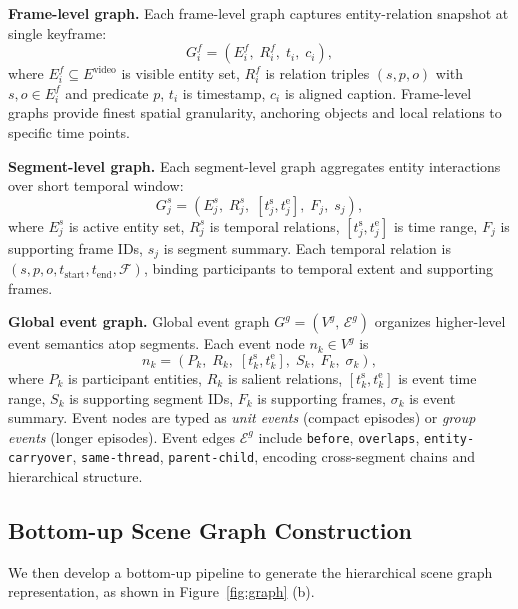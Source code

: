 \documentclass[sigconf, screen, review, anonymous]{acmart}
\begin{document}
\textbf{Frame-level graph.}
Each frame-level graph captures entity-relation snapshot at single
keyframe:
\begin{equation}
  G_i^{f} = (E_i^{f},\; R_i^{f},\; t_i,\; c_i),
\end{equation}
where $E_i^{f} \subseteq E^{\text{video}}$ is visible entity set,
$R_i^{f}$ is relation triples $(s, p, o)$ with
$s,o \in E_i^{f}$ and predicate $p$, $t_i$ is timestamp, $c_i$ is
aligned caption.  Frame-level graphs provide finest spatial
granularity, anchoring objects and local relations to
specific time points.

\textbf{Segment-level graph.}
Each segment-level graph aggregates entity interactions over short
temporal window:
\begin{equation}
  G_j^{s} = (E_j^{s},\; R_j^{s},\;
  [t_j^{\text{s}}, t_j^{\text{e}}],\; F_j,\; s_j),
\end{equation}
where $E_j^{s}$ is active entity set, $R_j^{s}$ is
temporal relations, $[t_j^{\text{s}}, t_j^{\text{e}}]$ is
time range, $F_j$ is supporting frame IDs, $s_j$ is
segment summary.  Each temporal relation is
$(s, p, o, t_{\text{start}}, t_{\text{end}}, \mathcal{F})$, binding
participants to temporal extent and supporting frames.

\textbf{Global event graph.}
Global event graph $G^{g}=(V^{g},\,\mathcal{E}^{g})$ organizes
higher-level event semantics atop segments.  Each event node
$n_k \in V^{g}$ is
\begin{equation}
  n_k = (P_k,\; R_k,\;
  [t_k^{\text{s}}, t_k^{\text{e}}],\; S_k,\; F_k,\; \sigma_k),
\end{equation}
where $P_k$ is participant entities, $R_k$ is salient relations,
$[t_k^{\text{s}}, t_k^{\text{e}}]$ is event time range, $S_k$ is
supporting segment IDs, $F_k$ is supporting frames,
$\sigma_k$ is event summary.  Event nodes are typed as
\emph{unit events} (compact episodes) or \emph{group events}
(longer episodes).  Event edges
$\mathcal{E}^{g}$ include \texttt{before},
\texttt{overlaps}, \texttt{entity-carryover}, \texttt{same-thread},
\texttt{parent-child}, encoding cross-segment chains and
hierarchical structure.


\subsection{Bottom-up Scene Graph Construction}
\label{sec:construction}

We then develop a bottom-up pipeline to generate the hierarchical scene graph representation, as shown in Figure~\ref{fig:graph} (b).
\end{document}
